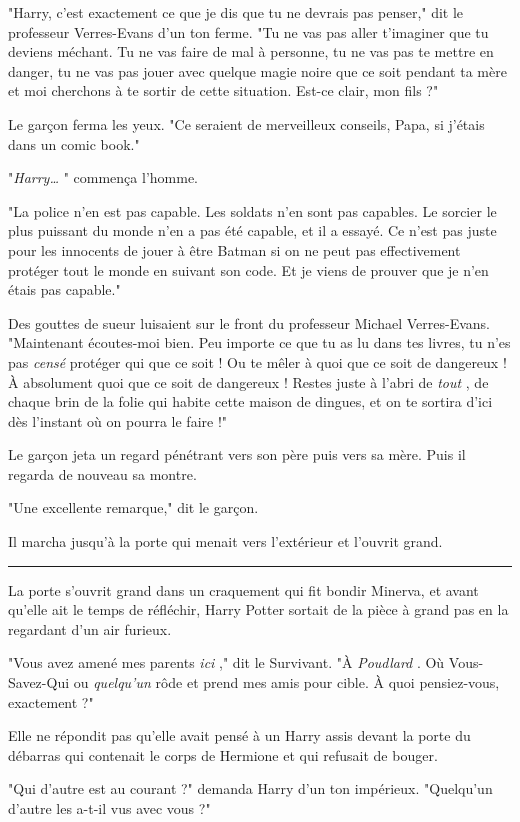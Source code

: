 "Harry, c'est exactement ce que je dis que tu ne devrais pas penser," dit le professeur Verres-Evans d'un ton ferme. "Tu ne vas pas aller t'imaginer que tu deviens méchant. Tu ne vas faire de mal à personne, tu ne vas pas te mettre en danger, tu ne vas pas jouer avec quelque magie noire que ce soit pendant ta mère et moi cherchons à te sortir de cette situation. Est-ce clair, mon fils ?"

Le garçon ferma les yeux. "Ce seraient de merveilleux conseils, Papa, si j'étais dans un comic book."

"\emph{Harry…} " commença l'homme.

"La police n'en est pas capable. Les soldats n'en sont pas capables. Le sorcier le plus puissant du monde n'en a pas été capable, et il a essayé. Ce n'est pas juste pour les innocents de jouer à être Batman si on ne peut pas effectivement protéger tout le monde en suivant son code. Et je viens de prouver que je n'en étais pas capable."

Des gouttes de sueur luisaient sur le front du professeur Michael Verres-Evans. "Maintenant écoutes-moi bien. Peu importe ce que tu as lu dans tes livres, tu n'es pas \emph{censé}  protéger qui que ce soit ! Ou te mêler à quoi que ce soit de dangereux ! À absolument quoi que ce soit de dangereux ! Restes juste à l'abri de \emph{tout} , de chaque brin de la folie qui habite cette maison de dingues, et on te sortira d'ici dès l'instant où on pourra le faire !"

Le garçon jeta un regard pénétrant vers son père puis vers sa mère. Puis il regarda de nouveau sa montre.

"Une excellente remarque," dit le garçon.

Il marcha jusqu'à la porte qui menait vers l'extérieur et l'ouvrit grand.
\par\noindent\rule{\textwidth}{0.4pt}
La porte s'ouvrit grand dans un craquement qui fit bondir Minerva, et avant qu'elle ait le temps de réfléchir, Harry Potter sortait de la pièce à grand pas en la regardant d'un air furieux.

"Vous avez amené mes parents \emph{ici} ," dit le Survivant. "À \emph{Poudlard} . Où Vous-Savez-Qui ou \emph{quelqu'un}  rôde et prend mes amis pour cible. À quoi pensiez-vous, exactement ?"

Elle ne répondit pas qu'elle avait pensé à un Harry assis devant la porte du débarras qui contenait le corps de Hermione et qui refusait de bouger.

"Qui d'autre est au courant ?" demanda Harry d'un ton impérieux. "Quelqu'un d'autre les a-t-il vus avec vous ?"

